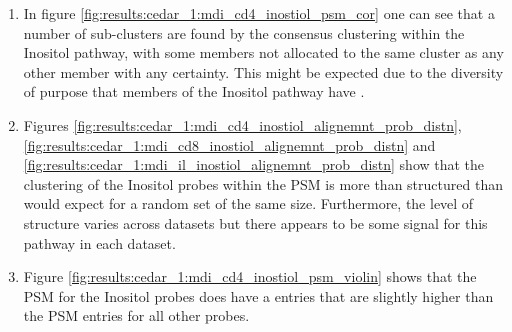 \documentclass[14pt]{extarticle} %
\begin{document}
	\newpage
	
%
%
		
	\newpage
	
	\begin{enumerate}
		\item In figure \ref{fig:results:cedar_1:mdi_cd4_inostiol_psm_cor} one can see that a number of sub-clusters are found by the consensus clustering within the Inositol pathway, with some members not allocated to the same cluster as any other member with any certainty. This might be expected due to the diversity of purpose that members of the Inositol pathway have \citep{monserrate2010inositol}.
		\item Figures \ref{fig:results:cedar_1:mdi_cd4_inostiol_alignemnt_prob_distn}, \ref{fig:results:cedar_1:mdi_cd8_inostiol_alignemnt_prob_distn} and \ref{fig:results:cedar_1:mdi_il_inostiol_alignemnt_prob_distn} show that the clustering of the Inositol probes within the PSM is more than structured than would expect for a random set of the same size. Furthermore, the level of structure varies across datasets but there appears to be some signal for this pathway in each dataset.
		\item Figure \ref{fig:results:cedar_1:mdi_cd4_inostiol_psm_violin} shows that the PSM for the Inositol probes does have a entries that are slightly higher than the PSM entries for all other probes.
	\end{enumerate}
	
	
\end{document}
